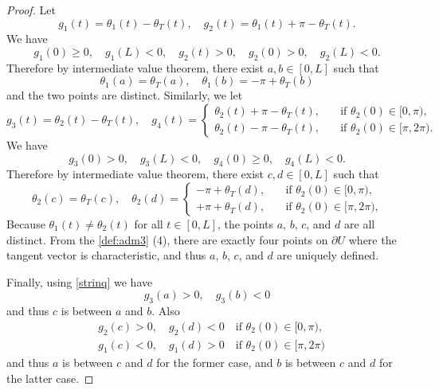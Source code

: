 \documentclass[11pt]{amsart}
\theoremstyle{plain}
\theoremstyle{remark}
\numberwithin{equation}{section}
\numberwithin{Thm}{section}
\begin{document}
\begin{proof}
Let 
$$g_1(t) = \theta_1(t) - \theta_T(t), \quad g_2(t) = \theta_1(t) + \pi - \theta_T(t).$$ We have 
$$g_1(0)\ge0, \quad g_1(L)<0, \quad g_2(t)>0, \quad g_2(0)>0, \quad g_2(L)<0.$$
Therefore by intermediate value theorem, there exist $a,b \in[0,L]$ such that 
$$\theta_1(a) = \theta_T(a), \quad \theta_1(b) = -\pi + \theta_T(b)$$
and the two points are distinct. Similarly, we let 
$$g_3(t) = \theta_2(t) - \theta_T(t), \quad g_4(t) = \left\{\begin{aligned} \theta_2(t)+\pi - \theta_T(t), \quad &\text{if $\theta_2(0) \in [0,\pi)$,}\\ \theta_2(t)-\pi - \theta_T(t), \quad &\text{if $\theta_2(0) \in [\pi,2\pi)$.} \end{aligned}\right.$$
We have
$$g_3(0)>0, \quad g_3(L)<0, \quad g_4(0)\ge0, \quad g_4(L)<0.$$
Therefore by intermediate value theorem, there exist $c, d\in[0,L]$ such that 
$$\theta_2(c) = \theta_T(c), \quad \theta_2(d) = \left\{\begin{aligned} - \pi+ \theta_T(d), \quad &\text{if $\theta_2(0) \in [0,\pi)$,}\\ +\pi + \theta_T(d), \quad &\text{if $\theta_2(0) \in [\pi,2\pi)$,} \end{aligned}\right.$$
Because $\theta_1(t)\ne \theta_2(t)$ for all $t\in [0,L]$, the points $a$, $b$, $c$, and $d$ are all distinct. From the \ref{def:adm3} (4), there are exactly four points on $\partial U$ where the tangent vector is characteristic, and thus $a$, $b$, $c$, and $d$ are uniquely defined.

Finally, using \eqref{strinq} we have 
$$g_3(a)>0, \quad g_3(b)<0$$
and thus $c$ is between $a$ and $b$. Also
\begin{align*}
 &g_2(c)>0, \quad g_2(d)<0 \quad \text{if $\theta_2(0) \in [0,\pi)$,}\\
 &g_1(c)<0, \quad g_1(d)>0 \quad \text{if $\theta_2(0) \in [\pi,2\pi)$}
\end{align*}
and thus $a$ is between $c$ and $d$ for the former case, and $b$ is between $c$ and $d$ for the latter case.
\end{proof}
\end{document}
